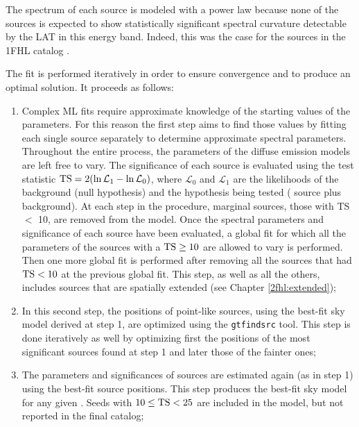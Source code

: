 The spectrum of each source is modeled with a power law because
none of the sources is expected to show statistically
significant spectral
curvature detectable by the LAT in this energy band. 
Indeed, this was the case for the sources in the 1FHL catalog \citep{1FHL}.

The fit is performed iteratively in order to ensure convergence and 
to produce an optimal solution. It proceeds as follows:

\begin{enumerate}
    \item Complex ML fits require approximate knowledge of the 
    starting values of the parameters. For this reason the first
    step  aims to find those values  by fitting each single source separately 
    to determine approximate spectral parameters.
    Throughout the entire process, the parameters of the diffuse emission
    models are left free to vary.
    The significance of each source is evaluated using the test statistic  
    ${\rm TS}=2(\ln \mathcal{L}_1 - \ln \mathcal{L}_0)$, where $\mathcal{L}_0$ and $\mathcal{L}_1$
    are the likelihoods of the background (null hypothesis) and 
    the hypothesis being tested (\eg{} source plus background). 
    At each step in the procedure, marginal sources, those with TS $<$ 10, are removed from the model.
    Once the spectral parameters and significance of each source have
    been evaluated, a global fit for which all the parameters of the sources
    with a ${\rm TS}\geq 10$ are allowed to  vary is performed. 
    Then one more global fit is performed after removing all the sources that had ${\rm TS}< 10$ at the previous global fit.
    This step,
    as well as all the others, includes sources that
    are spatially extended (see Chapter \ref{2fhl:extended});
    
    \item In this second step, the positions of point-like sources, using the best-fit sky model
    derived at step 1, are optimized using the {\tt gtfindsrc} tool. This step
    is done iteratively as well by optimizing first the positions of the
    most significant sources found at step 1 and later  those of the fainter
    ones;
    
    \item The parameters and significances of sources are estimated again (as in step 1) using the best-fit source positions. This step produces the best-fit sky 
    model for any given \roi{}. 
    Seeds with $10\leq {\rm TS}<25$ are included in the model, but not reported in the final catalog;
    

\end{enumerate}
